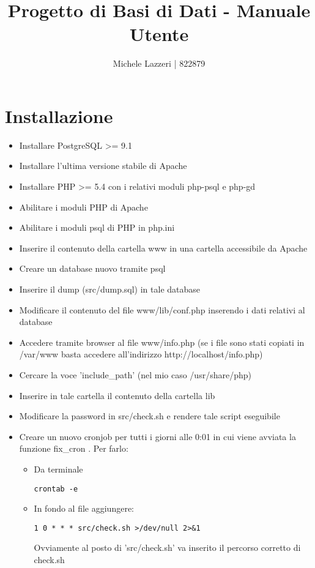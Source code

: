 \documentclass[a4paper,10pt]{article}
\title{Progetto di Basi di Dati - Manuale Utente}
\author{Michele Lazzeri | 822879}
\date{}
\begin{document}
\maketitle
\section{Installazione}
\begin{itemize}
\item Installare PostgreSQL >= 9.1
\item Installare l'ultima versione stabile di Apache
\item Installare PHP >= 5.4 con i relativi moduli php-psql e php-gd
\item Abilitare i moduli PHP di Apache
\item Abilitare i moduli psql di PHP in php.ini
\item Inserire il contenuto della cartella www in una cartella accessibile da Apache
\item Creare un database nuovo tramite psql
\item Inserire il dump (src/dump.sql) in tale database
\item Modificare il contenuto del file www/lib/conf.php inserendo i dati relativi al database
\item Accedere tramite browser al file www/info.php (se i file sono stati copiati in /var/www basta accedere all'indirizzo http://localhost/info.php)
\item Cercare la voce 'include\_{}path' (nel mio caso /usr/share/php)
\item Inserire in tale cartella il contenuto della cartella lib
\item Modificare la password in src/check.sh e rendere tale script eseguibile
\item Creare un nuovo cronjob per tutti i giorni alle 0:01 in cui viene avviata la funzione fix\_{}cron . Per farlo:
\begin{itemize}
\item Da terminale \begin{verbatim}
crontab -e
\end{verbatim}
\item In fondo al file aggiungere:
\begin{verbatim}
1 0 * * * src/check.sh >/dev/null 2>&1
\end{verbatim}
Ovviamente al posto di 'src/check.sh' va inserito il percorso corretto di check.sh
\end{itemize}

\end{itemize}
\end{document}
